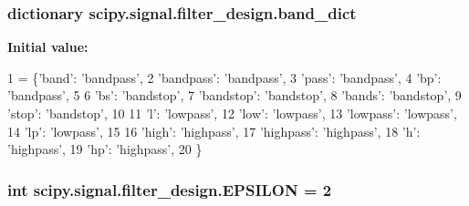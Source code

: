 \subsubsection[{band\+\_\+dict}]{\setlength{\rightskip}{0pt plus 5cm}dictionary scipy.\+signal.\+filter\+\_\+design.\+band\+\_\+dict}\label{namespacescipy_1_1signal_1_1filter__design_a3568772c57d8bb86cfe4133f6d3c738f}
{\bfseries Initial value\+:}
\begin{DoxyCode}
1 = \{\textcolor{stringliteral}{'band'}: \textcolor{stringliteral}{'bandpass'},
2              \textcolor{stringliteral}{'bandpass'}: \textcolor{stringliteral}{'bandpass'},
3              \textcolor{stringliteral}{'pass'}: \textcolor{stringliteral}{'bandpass'},
4              \textcolor{stringliteral}{'bp'}: \textcolor{stringliteral}{'bandpass'},
5 
6              \textcolor{stringliteral}{'bs'}: \textcolor{stringliteral}{'bandstop'},
7              \textcolor{stringliteral}{'bandstop'}: \textcolor{stringliteral}{'bandstop'},
8              \textcolor{stringliteral}{'bands'}: \textcolor{stringliteral}{'bandstop'},
9              \textcolor{stringliteral}{'stop'}: \textcolor{stringliteral}{'bandstop'},
10 
11              \textcolor{stringliteral}{'l'}: \textcolor{stringliteral}{'lowpass'},
12              \textcolor{stringliteral}{'low'}: \textcolor{stringliteral}{'lowpass'},
13              \textcolor{stringliteral}{'lowpass'}: \textcolor{stringliteral}{'lowpass'},
14              \textcolor{stringliteral}{'lp'}: \textcolor{stringliteral}{'lowpass'},
15 
16              \textcolor{stringliteral}{'high'}: \textcolor{stringliteral}{'highpass'},
17              \textcolor{stringliteral}{'highpass'}: \textcolor{stringliteral}{'highpass'},
18              \textcolor{stringliteral}{'h'}: \textcolor{stringliteral}{'highpass'},
19              \textcolor{stringliteral}{'hp'}: \textcolor{stringliteral}{'highpass'},
20              \}
\end{DoxyCode}
\hypertarget{namespacescipy_1_1signal_1_1filter__design_abf768628d14ff81355c222ac07cf68a1}{}
\subsubsection[{E\+P\+S\+I\+L\+O\+N}]{\setlength{\rightskip}{0pt plus 5cm}int scipy.\+signal.\+filter\+\_\+design.\+E\+P\+S\+I\+L\+O\+N = 2}\label{namespacescipy_1_1signal_1_1filter__design_abf768628d14ff81355c222ac07cf68a1}
\hypertarget{namespacescipy_1_1signal_1_1filter__design_a23ab4b1c5a1e9c67731e24f1cfc8123b}{}
